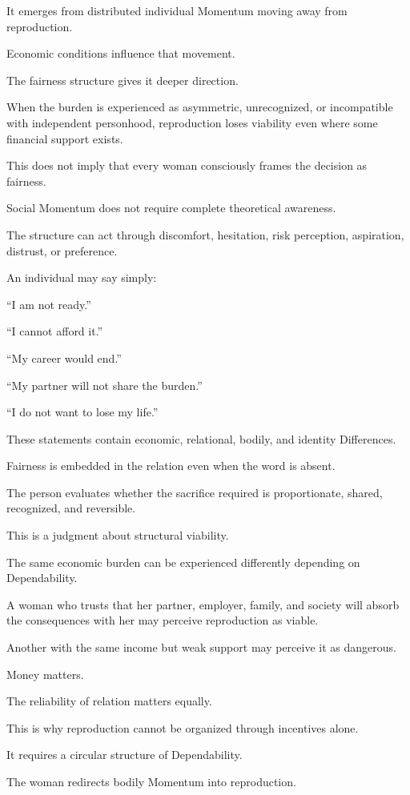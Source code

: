 It emerges from distributed individual Momentum moving away from reproduction.

Economic conditions influence that movement.

The fairness structure gives it deeper direction.

When the burden is experienced as asymmetric, unrecognized, or incompatible with independent personhood, reproduction loses viability even where some financial support exists.

This does not imply that every woman consciously frames the decision as fairness.

Social Momentum does not require complete theoretical awareness.

The structure can act through discomfort, hesitation, risk perception, aspiration, distrust, or preference.

An individual may say simply:

“I am not ready.”

“I cannot afford it.”

“My career would end.”

“My partner will not share the burden.”

“I do not want to lose my life.”

These statements contain economic, relational, bodily, and identity Differences.

Fairness is embedded in the relation even when the word is absent.

The person evaluates whether the sacrifice required is proportionate, shared, recognized, and reversible.

This is a judgment about structural viability.

The same economic burden can be experienced differently depending on Dependability.

A woman who trusts that her partner, employer, family, and society will absorb the consequences with her may perceive reproduction as viable.

Another with the same income but weak support may perceive it as dangerous.

Money matters.

The reliability of relation matters equally.

This is why reproduction cannot be organized through incentives alone.

It requires a circular structure of Dependability.

The woman redirects bodily Momentum into reproduction.

